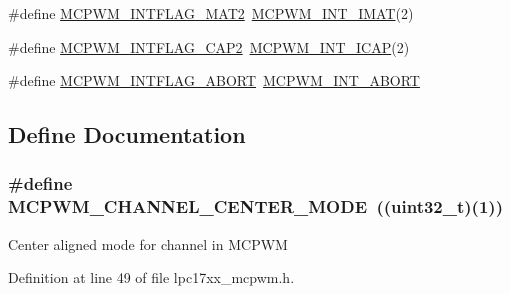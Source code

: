 \begin{DoxyCompactItemize}
\#define \hyperlink{group___m_c_p_w_m___public___macros_ga6e7c7e28089cbb79cffd61d3ce751236}{\-M\-C\-P\-W\-M\-\_\-\-I\-N\-T\-F\-L\-A\-G\-\_\-\-M\-A\-T2}~\hyperlink{group___m_c_p_w_m___private___macros_ga82c128589c028ca5ad7d7c5bc4391805}{\-M\-C\-P\-W\-M\-\_\-\-I\-N\-T\-\_\-\-I\-M\-A\-T}(2)
\item 
\#define \hyperlink{group___m_c_p_w_m___public___macros_ga8a29fd6df00cd470860850920043ec5d}{\-M\-C\-P\-W\-M\-\_\-\-I\-N\-T\-F\-L\-A\-G\-\_\-\-C\-A\-P2}~\hyperlink{group___m_c_p_w_m___private___macros_ga1879c9dcab254e222691496618e6fc53}{\-M\-C\-P\-W\-M\-\_\-\-I\-N\-T\-\_\-\-I\-C\-A\-P}(2)
\item 
\#define \hyperlink{group___m_c_p_w_m___public___macros_ga59a6241e22876cfdb960dc5722f38ae7}{\-M\-C\-P\-W\-M\-\_\-\-I\-N\-T\-F\-L\-A\-G\-\_\-\-A\-B\-O\-R\-T}~\hyperlink{group___m_c_p_w_m___private___macros_gafd0c9d24a856c464d45b93d9edaa7d3e}{\-M\-C\-P\-W\-M\-\_\-\-I\-N\-T\-\_\-\-A\-B\-O\-R\-T}
\end{DoxyCompactItemize}


\subsection{\-Define \-Documentation}
\hypertarget{group___m_c_p_w_m___public___macros_ga3101e708675b15c0fade244547225d14}{
\subsubsection[{\-M\-C\-P\-W\-M\-\_\-\-C\-H\-A\-N\-N\-E\-L\-\_\-\-C\-E\-N\-T\-E\-R\-\_\-\-M\-O\-D\-E}]{\setlength{\rightskip}{0pt plus 5cm}\#define {\bf \-M\-C\-P\-W\-M\-\_\-\-C\-H\-A\-N\-N\-E\-L\-\_\-\-C\-E\-N\-T\-E\-R\-\_\-\-M\-O\-D\-E}~((uint32\-\_\-t)(1))}}\label{group___m_c_p_w_m___public___macros_ga3101e708675b15c0fade244547225d14}
\-Center aligned mode for channel in \-M\-C\-P\-W\-M 

\-Definition at line 49 of file lpc17xx\-\_\-mcpwm.\-h.

